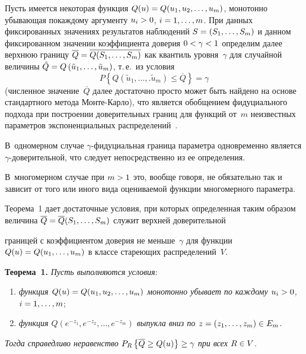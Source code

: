 \begin{multicols}{2}
     Пусть имеется некоторая функция $Q(u)\hm= Q(u_1, u_2, \ldots ,u_m)$, 
монотонно убывающая по\linebreak каж\-до\-му аргументу $u_i\hm> 0$, $i\hm=1,\ldots 
,m$. При данных фиксированных значениях результатов наблюдений $S\hm= 
(S_1,\ldots , S_m)$ и данном фиксированном значении коэффициента доверия 
$0\hm <\gamma\hm< 1$ определим далее верхнюю границу $\overline{Q}\hm= 
\overline{Q(S_1, \ldots , S_m)}$ как квантиль уровня~$\gamma$ для 
случайной величины $\tilde{Q}\hm= Q\left( \tilde{u}_1, \ldots , 
\tilde{u}_m\right)$, т.\,е.\ из условия 
     $$
     P\left\{ Q\left( \tilde{u}_1,\ldots ,. \tilde{u}_m\right) \leq 
\overline{Q}\right\} =\gamma
     $$
(численное значение~$\overline{Q}$ далее достаточно просто может быть 
найдено на основе стандартного метода Мон\-те-Кар\-ло), что является 
обобщением фидуциального подхода при построении доверительных границ 
для функций от~$m$ неизвестных па\-ра\-мет\-ров экспоненциальных 
распределений~\cite{6-pav, 14-pav, 15-pav}. 

В~одномерном случае 
$\gamma$-фи\-ду\-ци\-аль\-ная граница параметра одновременно является 
$\gamma$-до\-ве\-ри\-тель\-ной, что следует непосредственно из ее 
определения. 

В~многомерном случае при $m\hm>1$ это, вообще говоря, не 
обязательно так и зависит от того или иного вида оцениваемой функции 
многомерного параметра. 

Теорема~1 дает достаточные условия, при которых 
определенная таким образом величина $\overline{Q}\hm= \overline{Q}(S_1, 
\ldots , S_m)$ служит верхней доверительной\linebreak\vspace*{-12pt}

\pagebreak

\noindent
 границей с коэффициентом 
доверия не меньше~$\gamma$ для функции $Q(u)\hm= Q(u_1, \ldots , u_m)$ в 
классе стареющих распределений~$V$.
     
     \medskip
     
     \noindent
     \textbf{Теорема~1.} \textit{Пусть выполняются условия}:
     \begin{enumerate}[(1)] 
  \item \textit{функция $Q(u)\hm= Q(u_1, u_2, \ldots , u_m)$ монотонно 
убывает по каждому $u_i\hm> 0$, $i\hm= 1,\ldots ,m$};
  \item \textit{функция $Q\left( e^{-z_1}, e^{-z_2}, \ldots , e^{-z_m}\right)$ 
выпукла вниз по $z\hm= (z_1, \ldots ,z_m)\hm\in E_m$}.
  \end{enumerate}
     \textit{Тогда справедливо неравенство}
     $P_R\left\{ \overline{Q}\geq Q(u)\right\}\hm\geq\gamma$ \textit{при всех} 
$R\hm\in V$.
     

\end{multicols}

